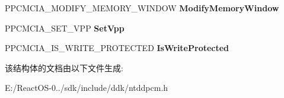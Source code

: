 \begin{DoxyCompactItemize}
P\+P\+C\+M\+C\+I\+A\+\_\+\+M\+O\+D\+I\+F\+Y\+\_\+\+M\+E\+M\+O\+R\+Y\+\_\+\+W\+I\+N\+D\+OW {\bfseries Modify\+Memory\+Window}
\item 
\mbox{\label{struct___p_c_m_c_i_a___i_n_t_e_r_f_a_c_e___s_t_a_n_d_a_r_d_a3b2decccb8368ab67a46fea7955a915b}} 
P\+P\+C\+M\+C\+I\+A\+\_\+\+S\+E\+T\+\_\+\+V\+PP {\bfseries Set\+Vpp}
\item 
\mbox{\label{struct___p_c_m_c_i_a___i_n_t_e_r_f_a_c_e___s_t_a_n_d_a_r_d_a46450f4c08ec866f748c1d5d80d73fbe}} 
P\+P\+C\+M\+C\+I\+A\+\_\+\+I\+S\+\_\+\+W\+R\+I\+T\+E\+\_\+\+P\+R\+O\+T\+E\+C\+T\+ED {\bfseries Is\+Write\+Protected}
\end{DoxyCompactItemize}


该结构体的文档由以下文件生成\+:\begin{DoxyCompactItemize}
\item 
E\+:/\+React\+O\+S-\/0../sdk/include/ddk/ntddpcm.\+h\end{DoxyCompactItemize}
